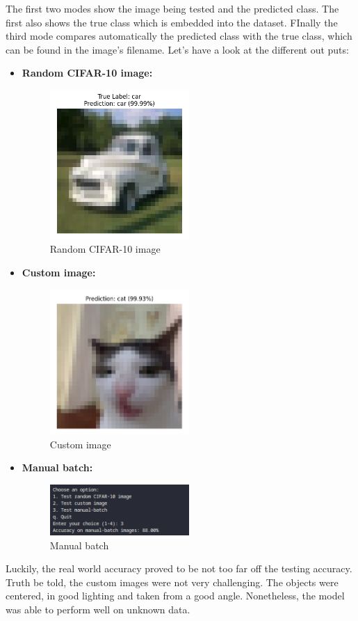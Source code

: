 The first two modes show the image being tested and the predicted class. The first also shows the 
true class which is embedded into the dataset. FInally the third mode compares automatically the 
predicted class with the true class, which can be found in the image's filename. Let's have a look
at the different out puts:
\begin{itemize}
    \item \textbf{Random CIFAR-10 image:} 
    \begin{figure}[H]
        \centering
        \includegraphics[width=0.5\textwidth]{media/random_cifar.png}
        \caption{Random CIFAR-10 image}
    \end{figure}
    \item \textbf{Custom image:} 
    \begin{figure}[H]
        \centering
        \includegraphics[width=0.5\textwidth]{media/custom_image.png}
        \caption{Custom image}
    \end{figure}
    \item \textbf{Manual batch:} 
    \begin{figure}[H]
        \centering
        \includegraphics[width=0.5\textwidth]{media/manual_batch.png}
        \caption{Manual batch}
    \end{figure}
\end{itemize}

Luckily, the real world accuracy proved to be not too far off the testing accuracy. Truth be told,
the custom images were not very challenging. The objects were centered, in good lighting and taken
from a good angle. Nonetheless, the model was able to perform well on unknown data.